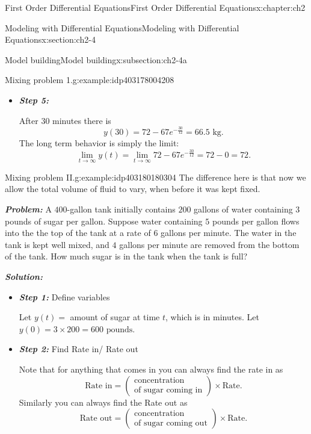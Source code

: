 \documentclass[oneside,10pt,]{book}
\newcommand{\alert}[1]{\textbf{\textit{#1}}}
\numberwithin{equation}{section}
\numberwithin{equation}{section}
\begin{document}
\begin{chapterptx}{First Order Differential Equations}{}{First Order Differential Equations}{}{}{x:chapter:ch2}
\begin{sectionptx}{Modeling with Differential Equations}{}{Modeling with Differential Equations}{}{}{x:section:ch2-4}
\begin{subsectionptx}{Model building}{}{Model building}{}{}{x:subsection:ch2-4a}
\begin{example}{Mixing problem 1.}{g:example:idp403178004208}
\begin{itemize}[label=\textbullet]
\begin{equation*}
\end{equation*}
%
\item{}\alert{Step 5:}%
\par
After 30 minutes there is%
\begin{equation*}
y(30)=72-67e^{-\frac{30}{12}}=66.5\mbox{ kg}.
\end{equation*}
The long term behavior is simply the limit:%
\begin{equation*}
\lim_{t\to\infty}y(t)=\lim_{t\to\infty}72-67e^{-\frac{30}{12}}=72-0=72.
\end{equation*}
%
\end{itemize}
\end{example}
\begin{example}{Mixing problem II.}{g:example:idp403180180304}%
The difference here is that now we allow the total volume of fluid to vary, when before it was kept fixed.%
\par
\alert{Problem:} A \(400\)-gallon tank initially contains \(200\) gallons of water containing \(3\) pounds of sugar per gallon. Suppose water containing \(5\) pounds per gallon flows into the the top of the tank at a rate of \(6\) gallons per minute. The water in the tank is kept well mixed, and \(4\) gallons per minute are removed from the bottom of the tank. How much sugar is in the tank when the tank is full?%
\par
\alert{Solution:}%
%
\begin{itemize}[label=\textbullet]
\item{}\alert{Step 1:} Define variables%
\par
Let \(y(t)=\) amount of sugar at time \(t\), which is in minutes. Let \(y(0)=3\times200=600\mbox{ pounds}\).%
\item{}\alert{Step 2:} Find Rate in\slash{} Rate out%
\par
Note that for anything that comes in you can always find the rate in as%
\begin{equation*}
\mbox{Rate in}=\left(\begin{array}{c}
\mbox{concentration}\\
\mbox{of sugar coming in}
\end{array}\right)\times\mbox{Rate}.
\end{equation*}
Similarly you can always find the Rate out as%
\begin{equation*}
\mbox{Rate out}=\left(\begin{array}{c}
\mbox{concentration}\\
\mbox{of sugar coming out}
\end{array}\right)\times\mbox{Rate}.

\end{equation*}
\end{itemize}
\end{example}
\end{subsectionptx}
\end{sectionptx}
\end{chapterptx}
\end{document}
